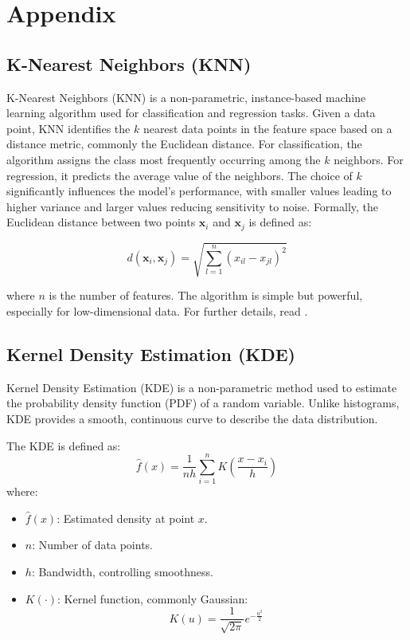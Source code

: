 \appendix
\section{Appendix}

\subsection{K-Nearest Neighbors (KNN)} \label{appendix:knn}
K-Nearest Neighbors (KNN) is a non-parametric, instance-based machine learning algorithm used for classification and regression tasks. Given a data point, KNN identifies the \(k\) nearest data points in the feature space based on a distance metric, commonly the Euclidean distance. For classification, the algorithm assigns the class most frequently occurring among the \(k\) neighbors. For regression, it predicts the average value of the neighbors. The choice of \(k\) significantly influences the model's performance, with smaller values leading to higher variance and larger values reducing sensitivity to noise. Formally, the Euclidean distance between two points \(\mathbf{x}_i\) and \(\mathbf{x}_j\) is defined as:

\[
d(\mathbf{x}_i, \mathbf{x}_j) = \sqrt{\sum_{l=1}^{n} (x_{il} - x_{jl})^2}
\]

where \(n\) is the number of features. The algorithm is simple but powerful, especially for low-dimensional data. For further details, read \cite{knn_model_based}.

\subsection{Kernel Density Estimation (KDE)} \label{appendix:kde}
Kernel Density Estimation (KDE) is a non-parametric method used to estimate the probability density function (PDF) of a random variable. Unlike histograms, KDE provides a smooth, continuous curve to describe the data distribution.

The KDE is defined as:
\[
\hat{f}(x) = \frac{1}{n h} \sum_{i=1}^{n} K\left(\frac{x - x_i}{h}\right)
\]
where:
\begin{itemize}
    \item \(\hat{f}(x)\): Estimated density at point \(x\).
    \item \(n\): Number of data points.
    \item \(h\): Bandwidth, controlling smoothness.
    \item \(K(\cdot)\): Kernel function, commonly Gaussian:
    \[
    K(u) = \frac{1}{\sqrt{2\pi}} e^{-\frac{u^2}{2}}
    \]
\end{itemize}

